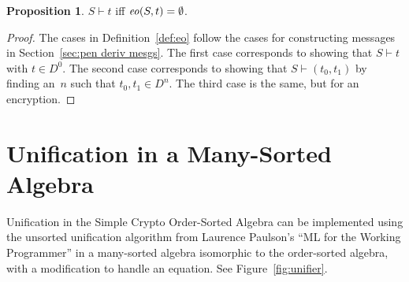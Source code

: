 \documentclass[12pt]{article}
\theoremstyle{definition}
\newtheorem{prop}{Proposition}[section]
\newcommand{\eo}{\fn{eo}}
\begin{document}
\begin{prop}
$S\vdash t$ iff $\eo(S,t)=\emptyset$.
\end{prop}
\begin{proof}
The cases in Definition~\ref{def:eo} follow the cases for constructing
messages in Section~\ref{sec:pen deriv mesgs}.  The first case
corresponds to showing that $S\vdash t$ with $t\in D^0$.  The second
case corresponds to showing that $S\vdash (t_0,t_1)$ by finding an~$n$
such that $t_0,t_1\in D^n$.  The third case is the same, but for an
encryption.
\end{proof}

\section{Unification in a Many-Sorted Algebra}

Unification in the Simple Crypto Order-Sorted Algebra can be
implemented using the unsorted unification algorithm from Laurence
Paulson's ``ML for the Working Programmer'' in a many-sorted algebra
isomorphic to the order-sorted algebra, with a modification to handle
an equation.  See Figure~\ref{fig:unifier}.
\end{document}
